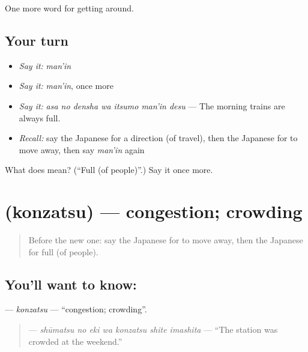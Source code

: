 \begin{grammarlens}[title={What you've built}]
One more word for getting around.
\end{grammarlens}

\subsection*{Your turn}
\begin{itemize}
\raggedright
  \item \emph{Say it:} \emph{man'in}
  \item \emph{Say it:} \emph{man'in}, once more
  \item \emph{Say it:} \emph{asa no densha wa itsumo man'in desu} — The morning trains are always full.
  \item \emph{Recall:} say the Japanese for a direction (of travel), then the Japanese for to move away, then say \emph{man'in} again
\end{itemize}

\begin{tcolorbox}[breakable,colback=teal!4,colframe=teal!35!black,title={Before you move on}]
What does  mean? (\textquotedblleft{}Full (of people)\textquotedblright{}.) Say it once more.
\end{tcolorbox}
\section[\texorpdfstring{\ja{こんざつ} (konzatsu)}{こんざつ (konzatsu)}]{ (konzatsu) — congestion; crowding}

\label{lesson:JA-C378-konzatsu}



\begin{quote}
Before the new one: say the Japanese for to move away, then the Japanese for full (of people).
\end{quote}

\subsection*{You'll want to know: }
\textbf{} — \emph{konzatsu} — \textquotedblleft{}congestion; crowding\textquotedblright{}.

\begin{quote}
\textbf{  } — \emph{shūmatsu no eki wa konzatsu shite imashita} — \textquotedblleft{}The station was crowded at the weekend.\textquotedblright{}
\end{quote}

